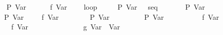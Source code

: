 \begin{isabellebody}
\ \ \ \ {}\isanewline
\ \ {}\ P\ {}Var\ {}{}\isanewline
\ \ {}\ {}\ {}{}\ f\ {}Var\ {}{}\isanewline
\ \ {}\ loop\isanewline
\ \ \ \ {}\ {}{}P\ {}Var\ {}{}{}\ {}\ seq\isanewline
\ \ \ \ \ \ {}\ P\ {}Var\ {}{}\isanewline
\ \ \ \ \ \ {}\ {}{}{}P\ {}Var\ {}{}{}\ {}\ {}\ {}{}\ f\ {}Var\ {}{}{}\isanewline
\ \ \ \ \ \ {}\ P\ {}Var\ {}{}\isanewline
\ \ \ \ \ \ {}\ {}\ {}P\ {}Var\ {}{}{}\isanewline
\ \ \ \ \ \ {}\ {}\ {}{}\ f\ {}Var\ {}{}\isanewline
\ \ \ \ \ \ {}\ {}\ {}{}\ f\ {}Var\ {}{}\isanewline
\ \ \ \ \ \ {}\isanewline
\ \ \ \ {}\ {}\ {}{}\ g\ {}Var\ {}{}\ {}Var\ {}{}\isanewline

\end{isabellebody}
